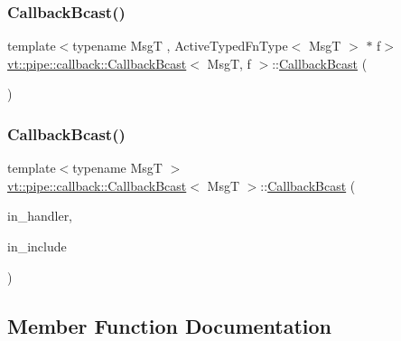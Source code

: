 \subsubsection{\texorpdfstring{Callback\+Bcast()}{CallbackBcast()}\hspace{0.1cm}{\footnotesize\ttfamily [4/5]}}
{\footnotesize\ttfamily template$<$typename MsgT , Active\+Typed\+Fn\+Type$<$ Msg\+T $>$ $\ast$ f$>$ \\
\hyperlink{structvt_1_1pipe_1_1callback_1_1_callback_bcast}{vt\+::pipe\+::callback\+::\+Callback\+Bcast}$<$ MsgT, f $>$\+::\hyperlink{structvt_1_1pipe_1_1callback_1_1_callback_bcast}{Callback\+Bcast} (\begin{DoxyParamCaption}\item[{\hyperlink{structvt_1_1pipe_1_1callback_1_1_callback_bcast}{Callback\+Bcast}$<$ MsgT, f $>$ \&\&}]{ }\end{DoxyParamCaption})\hspace{0.3cm}{\ttfamily [default]}}

\mbox{\label{structvt_1_1pipe_1_1callback_1_1_callback_bcast_a7a1ad4445c17e0da91a128ac0b0cdde1}} 
\subsubsection{\texorpdfstring{Callback\+Bcast()}{CallbackBcast()}\hspace{0.1cm}{\footnotesize\ttfamily [5/5]}}
{\footnotesize\ttfamily template$<$typename MsgT $>$ \\
\hyperlink{structvt_1_1pipe_1_1callback_1_1_callback_bcast}{vt\+::pipe\+::callback\+::\+Callback\+Bcast}$<$ MsgT $>$\+::\hyperlink{structvt_1_1pipe_1_1callback_1_1_callback_bcast}{Callback\+Bcast} (\begin{DoxyParamCaption}\item[{\hyperlink{namespacevt_af64846b57dfcaf104da3ef6967917573}{Handler\+Type} const \&}]{in\+\_\+handler,  }\item[{bool const \&}]{in\+\_\+include }\end{DoxyParamCaption})}



\subsection{Member Function Documentation}
\mbox{\label{structvt_1_1pipe_1_1callback_1_1_callback_bcast_a7585164f2854f2af3f23af0e0468e0c8}} 
